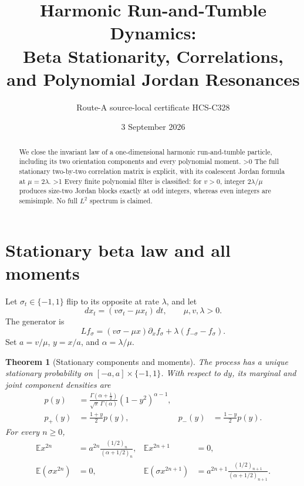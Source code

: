 \documentclass[10pt]{article}
\title{Harmonic Run-and-Tumble Dynamics:\\Beta Stationarity, Correlations, and Polynomial Jordan Resonances}
\author{Route-A source-local certificate HCS-C328}
\date{3 September 2026}
\providecommand{\CRevisionRound}{2}
\newtheorem{theorem}{Theorem}
\newcommand{\EE}{\mathbb E}
\begin{document}
\maketitle
\begin{abstract}
We close the invariant law of a one-dimensional harmonic run-and-tumble
particle, including its two orientation components and every polynomial
moment.
\ifnum\CRevisionRound>0
The full stationary two-by-two correlation matrix is explicit, with its
coalescent Jordan formula at $\mu=2\lambda$.
\fi
\ifnum\CRevisionRound>1
Every finite polynomial filter is classified: for $v>0$, integer
$2\lambda/\mu$ produces size-two Jordan blocks exactly at odd integers,
whereas even integers are semisimple.  No full $L^2$ spectrum is claimed.
\fi
\end{abstract}

\section{Stationary beta law and all moments}
Let $\sigma_t\in\{-1,1\}$ flip to its opposite at rate $\lambda$, and let
\begin{equation}\label{eq:model}
 dx_t=(v\sigma_t-\mu x_t)\,dt,
 \qquad \mu,v,\lambda>0.
\end{equation}
The generator is
\[
 Lf_\sigma=(v\sigma-\mu x)\partial_xf_\sigma
 +\lambda(f_{-\sigma}-f_\sigma).
\]
Set $a=v/\mu$, $y=x/a$, and $\alpha=\lambda/\mu$.

\begin{theorem}[Stationary components and moments]\label{thm:stationary}
The process has a unique stationary probability on $[-a,a]\times\{-1,1\}$.
With respect to $dy$, its marginal and joint component densities are
\begin{align}
 p(y)&=\frac{\Gamma(\alpha+\tfrac12)}
 {\sqrt\pi\,\Gamma(\alpha)}(1-y^2)^{\alpha-1},\label{eq:beta}\\
 p_+(y)&=\frac{1+y}{2}p(y),&
 p_-(y)&=\frac{1-y}{2}p(y).\label{eq:components}
\end{align}
For every $n\geq0$,
\begin{align}
 \EE x^{2n}&=a^{2n}\frac{(1/2)_n}{(\alpha+1/2)_n},&
 \EE x^{2n+1}&=0,\label{eq:moments}\\
 \EE(\sigma x^{2n})&=0,&
 \EE(\sigma x^{2n+1})
 &=a^{2n+1}\frac{(1/2)_{n+1}}{(\alpha+1/2)_{n+1}}.
\end{align}
\end{theorem}
\end{document}
